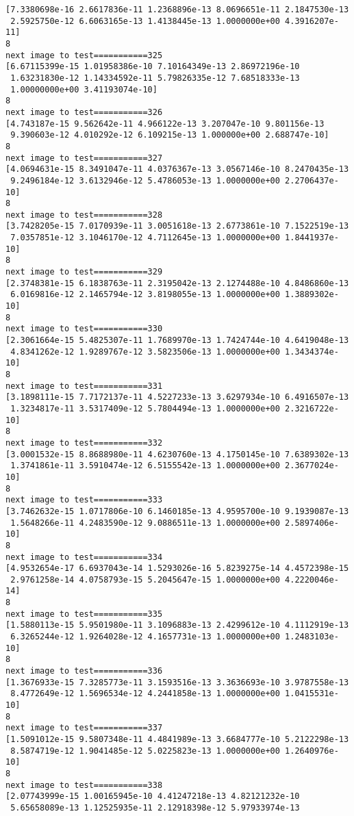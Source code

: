 \documentclass[11pt]{article}
\begin{document}
\begin{Verbatim}[commandchars=\\\{\}]
[7.3380698e-16 2.6617836e-11 1.2368896e-13 8.0696651e-11 2.1847530e-13
 2.5925750e-12 6.6063165e-13 1.4138445e-13 1.0000000e+00 4.3916207e-11]
8
next image to test===========325
[6.67115399e-15 1.01958386e-10 7.10164349e-13 2.86972196e-10
 1.63231830e-12 1.14334592e-11 5.79826335e-12 7.68518333e-13
 1.00000000e+00 3.41193074e-10]
8
next image to test===========326
[4.743187e-15 9.562642e-11 4.966122e-13 3.207047e-10 9.801156e-13
 9.390603e-12 4.010292e-12 6.109215e-13 1.000000e+00 2.688747e-10]
8
next image to test===========327
[4.0694631e-15 8.3491047e-11 4.0376367e-13 3.0567146e-10 8.2470435e-13
 9.2496184e-12 3.6132946e-12 5.4786053e-13 1.0000000e+00 2.2706437e-10]
8
next image to test===========328
[3.7428205e-15 7.0170939e-11 3.0051618e-13 2.6773861e-10 7.1522519e-13
 7.0357851e-12 3.1046170e-12 4.7112645e-13 1.0000000e+00 1.8441937e-10]
8
next image to test===========329
[2.3748381e-15 6.1838763e-11 2.3195042e-13 2.1274488e-10 4.8486860e-13
 6.0169816e-12 2.1465794e-12 3.8198055e-13 1.0000000e+00 1.3889302e-10]
8
next image to test===========330
[2.3061664e-15 5.4825307e-11 1.7689970e-13 1.7424744e-10 4.6419048e-13
 4.8341262e-12 1.9289767e-12 3.5823506e-13 1.0000000e+00 1.3434374e-10]
8
next image to test===========331
[3.1898111e-15 7.7172137e-11 4.5227233e-13 3.6297934e-10 6.4916507e-13
 1.3234817e-11 3.5317409e-12 5.7804494e-13 1.0000000e+00 2.3216722e-10]
8
next image to test===========332
[3.0001532e-15 8.8688980e-11 4.6230760e-13 4.1750145e-10 7.6389302e-13
 1.3741861e-11 3.5910474e-12 6.5155542e-13 1.0000000e+00 2.3677024e-10]
8
next image to test===========333
[3.7462632e-15 1.0717806e-10 6.1460185e-13 4.9595700e-10 9.1939087e-13
 1.5648266e-11 4.2483590e-12 9.0886511e-13 1.0000000e+00 2.5897406e-10]
8
next image to test===========334
[4.9532654e-17 6.6937043e-14 1.5293026e-16 5.8239275e-14 4.4572398e-15
 2.9761258e-14 4.0758793e-15 5.2045647e-15 1.0000000e+00 4.2220046e-14]
8
next image to test===========335
[1.5880113e-15 5.9501980e-11 3.1096883e-13 2.4299612e-10 4.1112919e-13
 6.3265244e-12 1.9264028e-12 4.1657731e-13 1.0000000e+00 1.2483103e-10]
8
next image to test===========336
[1.3676933e-15 7.3285773e-11 3.1593516e-13 3.3636693e-10 3.9787558e-13
 8.4772649e-12 1.5696534e-12 4.2441858e-13 1.0000000e+00 1.0415531e-10]
8
next image to test===========337
[1.5091012e-15 9.5807348e-11 4.4841989e-13 3.6684777e-10 5.2122298e-13
 8.5874719e-12 1.9041485e-12 5.0225823e-13 1.0000000e+00 1.2640976e-10]
8
next image to test===========338
[2.07743999e-15 1.00165945e-10 4.41247218e-13 4.82121232e-10
 5.65658089e-13 1.12525935e-11 2.12918398e-12 5.97933974e-13

\end{Verbatim}
\end{document}
